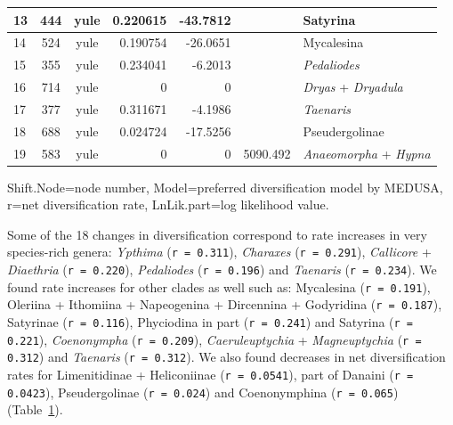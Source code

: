 \documentclass[10pt,letterpaper]{article}
\begin{document}
\begin{table}[!ht]
\begin{adjustwidth}{-2.25in}{0in}
\begin{tabular}{|l|c|c|r|r|c|l|}
13              & 444        & yule  & 0.220615   & -43.7812   &          & Satyrina                                                   \\ \hline
14              & 524        & yule  & 0.190754   & -26.0651   &          & Mycalesina                                                 \\ \hline
15              & 355        & yule  & 0.234041   & -6.2013    &          & \emph{Pedaliodes}                                          \\ \hline
16              & 714        & yule  & 0          & 0          &          & \emph{Dryas} + \emph{Dryadula}                             \\ \hline
17              & 377        & yule  & 0.311671   & -4.1986    &          & \emph{Taenaris}                                            \\ \hline
18              & 688        & yule  & 0.024724   & -17.5256   &          & Pseudergolinae                                             \\ \hline
19              & 583        & yule  & 0          & 0          & 5090.492 & \emph{Anaeomorpha} + \emph{Hypna}                          \\ \hline
\end{tabular}
\begin{flushleft}Shift.Node=node number, Model=preferred diversification model by MEDUSA, r=net diversification rate, LnLik.part=log likelihood value.
\end{flushleft}
\label{table1}
\end{adjustwidth}
\end{table}

Some of the 18 changes in diversification correspond to rate increases
in very species-rich genera: \emph{Ypthima} (\texttt{r = 0.311}),
\emph{Charaxes} (\texttt{r = 0.291}), \emph{Callicore} +
\emph{Diaethria} (\texttt{r = 0.220}), \emph{Pedaliodes}
(\texttt{r = 0.196}) and \emph{Taenaris} (\texttt{r = 0.234}). We found
rate increases for other clades as well such as: Mycalesina
(\texttt{r = 0.191}), Oleriina + Ithomiina + Napeogenina + Dircennina +
Godyridina (\texttt{r = 0.187}), Satyrinae (\texttt{r = 0.116}),
Phyciodina in part (\texttt{r = 0.241}) and Satyrina
(\texttt{r = 0.221}), \emph{Coenonympha} (\texttt{r = 0.209}),
\emph{Caeruleuptychia} + \emph{Magneuptychia} (\texttt{r = 0.312}) and
\emph{Taenaris} (\texttt{r = 0.312}). We also found decreases in net
diversification rates for Limenitidinae + Heliconiinae
(\texttt{r = 0.0541}), part of Danaini (\texttt{r = 0.0423}),
Pseudergolinae (\texttt{r = 0.024}) and Coenonymphina
(\texttt{r = 0.065}) (Table~\ref{table1}).
\end{document}
